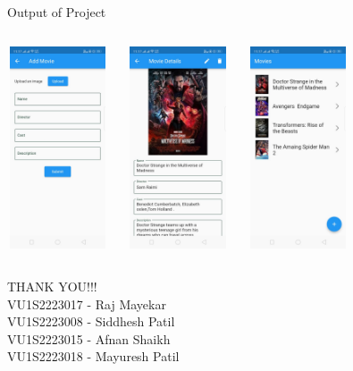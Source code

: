 \documentclass{beamer}
\begin{document}
\begin{frame}{Output of Project}
\begin{columns}
    \includegraphics[width=3cm, height=6cm]{ot1.jpeg}
    
    \includegraphics[width=3cm, height=6cm]{ot2.jpeg}
    
    \includegraphics[width=3cm, height=6cm]{ot3.jpeg}
    
\end{columns}
\end{frame}

\begin{frame}
    \vspace{2cm}
    \centering\huge{THANK YOU!!!}
    \vspace{1cm}
    \normalsize {
        \\VU1S2223017 - Raj Mayekar
        \\VU1S2223008 - Siddhesh Patil
        \\VU1S2223015 - Afnan Shaikh
        \\VU1S2223018 - Mayuresh Patil
    }
\end{frame}
\end{document}
